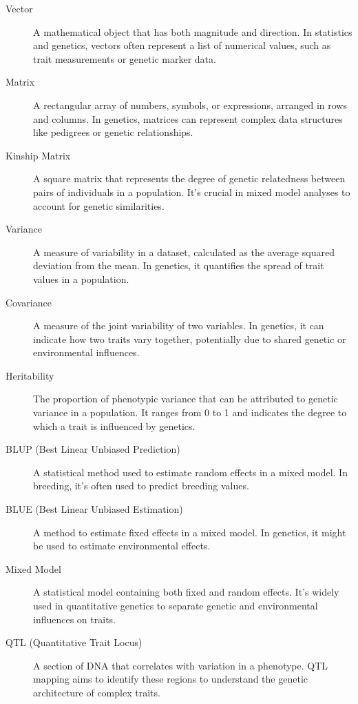 \documentclass[12pt,a4paper]{article}
\begin{document}
\begin{description}

\item[Vector] A mathematical object that has both magnitude and direction. In statistics and genetics, vectors often represent a list of numerical values, such as trait measurements or genetic marker data.

\item[Matrix] A rectangular array of numbers, symbols, or expressions, arranged in rows and columns. In genetics, matrices can represent complex data structures like pedigrees or genetic relationships.

\item[Kinship Matrix] A square matrix that represents the degree of genetic relatedness between pairs of individuals in a population. It's crucial in mixed model analyses to account for genetic similarities.

\item[Variance] A measure of variability in a dataset, calculated as the average squared deviation from the mean. In genetics, it quantifies the spread of trait values in a population.

\item[Covariance] A measure of the joint variability of two variables. In genetics, it can indicate how two traits vary together, potentially due to shared genetic or environmental influences.

\item[Heritability] The proportion of phenotypic variance that can be attributed to genetic variance in a population. It ranges from 0 to 1 and indicates the degree to which a trait is influenced by genetics.

\item[BLUP (Best Linear Unbiased Prediction)] A statistical method used to estimate random effects in a mixed model. In breeding, it's often used to predict breeding values.

\item[BLUE (Best Linear Unbiased Estimation)] A method to estimate fixed effects in a mixed model. In genetics, it might be used to estimate environmental effects.

\item[Mixed Model] A statistical model containing both fixed and random effects. It's widely used in quantitative genetics to separate genetic and environmental influences on traits.

\item[QTL (Quantitative Trait Locus)] A section of DNA that correlates with variation in a phenotype. QTL mapping aims to identify these regions to understand the genetic architecture of complex traits.


\end{description}
\end{document}
